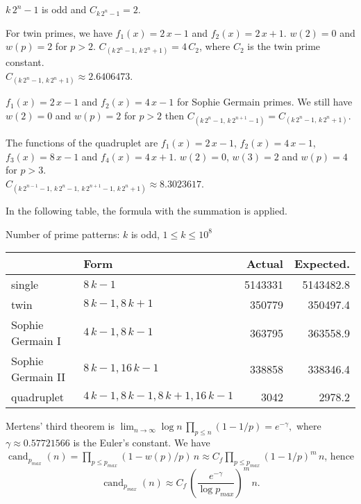 \documentclass[a4paper, 12pt]{article}
\DeclareMathOperator{\cand}{cand}
\newcommand\T{\rule{0pt}{2.6ex}}
\theoremstyle{plain}
\theoremstyle{definition}
\begin{document}
\medskip

$k\,2^n - 1$ is odd and $C_{k\,2^n - 1} = 2$.

\medskip

For twin primes, we have $f_1(x) = 2\,x - 1$ and $f_2(x) = 2\,x + 1$. $w(2) = 0$ and
$w(p) = 2$ for $p > 2$. $C_{(k\,2^n - 1,\, k\,2^n + 1)} = 4\,C_2$, where $C_2$ is the
twin prime constant.\\
$C_{(k\,2^n - 1,\, k\,2^n + 1)} \approx 2.6406473$.

\medskip

$f_1(x) = 2\,x - 1$ and $f_2(x) = 4\,x - 1$ for Sophie Germain primes. We still have $w(2) = 0$ and
$w(p) = 2$ for $p > 2$ then  $C_{(k\,2^n - 1,\, k\,2^{n+1} - 1)} = C_{(k\,2^n - 1,\, k\,2^n + 1)}$.

\medskip

The functions of the quadruplet are $f_1(x) = 2\,x - 1$, $f_2(x) = 4\,x - 1$, $f_3(x) = 8\,x - 1$
and $f_4(x) = 4\,x + 1$. $w(2) = 0$, $w(3) = 2$ and $w(p) = 4$ for $p > 3$.\\
$C_{(k\,2^{n-1} - 1,\, k\,2^n - 1,\, k\,2^{n+1} - 1,\, k\,2^n + 1)} \approx 8.3023617$.

\medskip

In the following table, the formula with the summation is applied.
\begin{center}
Number of prime patterns: $k$ is odd, $1 \leq k \leq 10^8$
\smallskip

\begin{tabular}{llrr}
& Form & Actual & Expected.\\
\hline \T
single & $8\,k - 1$ & 5143331 & 5143482.8\\
twin & $8\,k - 1, 8\,k + 1$ & 350779 & 350497.4\\
Sophie Germain I & $4\,k - 1, 8\,k - 1$ & 363795 & 363558.9 \\
Sophie Germain II & $8\,k - 1, 16\,k - 1$ & 338858 & 338346.4\\
quadruplet & $4\,k - 1, 8\,k - 1, 8\,k + 1, 16\, k - 1$ & 3042 & 2978.2
\end{tabular}
\end{center}

\medskip

Mertens' third theorem is $\lim_{n \to \infty} \log n\, \prod_{p \leq n} \left(1 - 1/p\right)
= e^{-\gamma},$ where $\gamma \approx 0.57721566$ is the Euler's constant. We have
$\cand_{p_{max}}(n) = \prod_{p\leq p_{max}}\left(1 - w(p)/p\right)\,n
\approx C_f \prod_{p\leq p_{max}}\left(1 - 1/p\right)^m\,n$, hence
\[\cand_{p_{max}}(n) \approx C_f\, \left(\frac{e^{-\gamma}}{\log p_{max}}\right)^m\, n.\]
\end{document}
